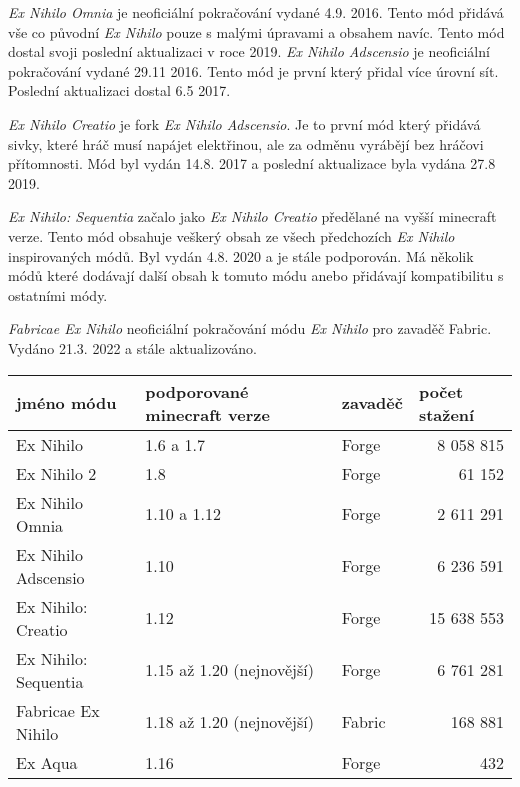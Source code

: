 \documentclass[FM,RP]{tulthesis}
\begin{document}
 \par       \textit{Ex Nihilo Omnia} je neoficiální pokračování vydané 4.9. 2016. Tento mód přidává vše co původní \textit{ Ex Nihilo} pouze s malými úpravami a obsahem navíc. Tento mód dostal svoji poslední aktualizaci v roce 2019.
\textit{Ex Nihilo Adscensio} je neoficiální pokračování vydané 29.11 2016. Tento mód je první který přidal více úrovní sít. Poslední aktualizaci dostal 6.5 2017.
\par    \textit{Ex Nihilo Creatio} je fork \textit{Ex Nihilo Adscensio}. Je to první mód který přidává sivky, které hráč musí napájet elektřinou, ale za odměnu vyrábějí bez hráčovi přítomnosti. Mód byl vydán 14.8. 2017 a poslední aktualizace byla vydána 27.8 2019.
\par    \textit{Ex Nihilo: Sequentia} začalo jako  \textit{Ex Nihilo Creatio} předělané na vyšší minecraft verze. Tento mód obsahuje veškerý obsah ze všech předchozích \textit{Ex Nihilo} inspirovaných módů. Byl vydán 4.8. 2020 a je stále podporován. Má několik módů které dodávají další obsah k tomuto módu anebo přidávají kompatibilitu s ostatními módy. 
\par    \textit{Fabricae Ex Nihilo} neoficiální pokračování módu  \textit{Ex Nihilo} pro zavaděč Fabric. Vydáno 21.3. 2022 a stále aktualizováno.

\begin{table}[]
\begin{tabular}{lllr}
\hline
\multicolumn{1}{|l|}{jméno módu} & \multicolumn{1}{l|}{podporované minecraft verze} & \multicolumn{1}{l|}{zavaděč} & \multicolumn{1}{l|}{počet stažení} \\ \hline
Ex Nihilo                        & 1.6 a 1.7                                        & Forge                        & 8 058 815                          \\
Ex Nihilo 2                      & 1.8                                              & Forge                        & 61 152                             \\
Ex Nihilo Omnia                  & 1.10 a 1.12                                      & Forge                        & 2 611 291                          \\
Ex Nihilo Adscensio              & 1.10                                             & Forge                        & 6 236 591                          \\
Ex Nihilo: Creatio               & 1.12                                             & Forge                        & 15 638 553                         \\
Ex Nihilo: Sequentia             & 1.15 až 1.20 (nejnovější)                        & Forge                        & 6 761 281                          \\
Fabricae Ex Nihilo               & 1.18 až 1.20 (nejnovější)                        & Fabric                       & 168 881                            \\
Ex Aqua                          & 1.16                                             & Forge                        & 432                               
\end{tabular}
\end{table}
        
\end{document}
